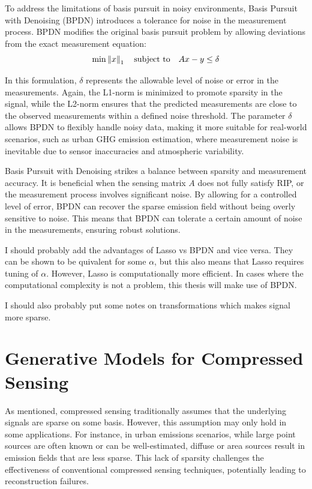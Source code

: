 To address the limitations of basis pursuit in noisy environments, Basis Pursuit with Denoising (BPDN) introduces a tolerance for noise in the measurement process.
BPDN modifies the original basis pursuit problem by allowing deviations from the exact measurement equation:
\begin{equation}
 \min \left\lVert x\right\rVert_1 \quad \text{subject to} \quad  Ax -y \le \delta
\end{equation}

In this formulation, $\delta$ represents the allowable level of noise or error in the measurements.
Again, the L1-norm is minimized to promote sparsity in the signal, while the L2-norm ensures that the predicted measurements are close to the observed measurements within a defined noise threshold.
The parameter $\delta$ allows BPDN to flexibly handle noisy data, making it more suitable for real-world scenarios, such as urban GHG emission estimation, where measurement noise is inevitable due to sensor inaccuracies and atmospheric variability.

Basis Pursuit with Denoising strikes a balance between sparsity and measurement accuracy. It is beneficial when the sensing matrix $A$ does not fully satisfy RIP, or the measurement process involves significant noise.
By allowing for a controlled level of error, BPDN can recover the sparse emission field without being overly sensitive to noise.
This means that BPDN can tolerate a certain amount of noise in the measurements, ensuring robust solutions.

I should probably add the advantages of Lasso vs BPDN and vice versa.
They can be shown to be quivalent for some $\alpha$, but this also means that Lasso requires tuning of $\alpha$.
However, Lasso is computationally more efficient.
In cases where the computational complexity is not a problem, this thesis will make use of BPDN.

I should also probably put some notes on transformations which makes signal more sparse.

\section{Generative Models for Compressed Sensing}
As mentioned, compressed sensing traditionally assumes that the underlying signals are sparse on some basis.
However, this assumption may only hold in some applications.
For instance, in urban emissions scenarios, while large point sources are often known or can be well-estimated, diffuse or area sources result in emission fields that are less sparse.
This lack of sparsity challenges the effectiveness of conventional compressed sensing techniques, potentially leading to reconstruction failures.

